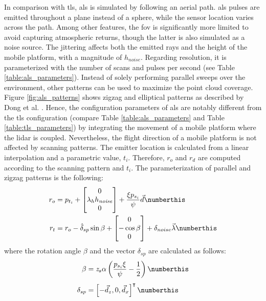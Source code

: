 In comparison with \acrshort{tls}, \acrshort{als} is simulated by following an aerial path. \acrshort{als} pulses are emitted throughout a plane instead of a sphere, while the sensor location varies across the path. Among other features, the \acrshort{fov} is significantly more limited to avoid capturing atmospheric returns, though the latter is also simulated as a noise source. The jittering affects both the emitted rays and the height of the mobile platform, with a magnitude of $h_\textit{noise}$. Regarding resolution, it is parameterized with the number of scans and pulses per second (see Table \ref{table:als_parameters}). Instead of solely performing parallel sweeps over the environment, other patterns can be used to maximize the point cloud coverage. Figure \ref{fig:als_patterns} shows zigzag and elliptical patterns as described by Dong et al. \cite{dong_lidar_2018}. Hence, the configuration parameters of \acrshort{als} are notably different from the \acrshort{tls} configuration (compare Table \ref{table:als_parameters} and Table \ref{table:tls_parameters}) by integrating the movement of a mobile platform where the \acrshort{lidar} is coupled. Nevertheless, the flight direction of a mobile platform is not affected by scanning patterns. The emitter location is calculated from a linear interpolation and a parametric value, $t_i$. Therefore, $r_o$ and $r_d$ are computed according to the scanning pattern and $t_i$. The parameterization of parallel and zigzag patterns is the following:
\begin{align*}
    r_{o} &= p_{t_{i}} + 
    \begin{bmatrix} 0 \\ \lambda_{h}h_{\textit{noise}} \\ 0 \end{bmatrix} + \frac{\xi p_{s_{i}}}{\psi} \vec{d}
    \numberthis \label{eq:ray_origin_als_zigzag}\\
    r_{t} &= r_{o} - \hat{\delta}_{sp} \sin{\beta} +
    \begin{bmatrix}0 \\ -\cos{\beta}\\ 0 \end{bmatrix} + \delta_{noise}\vec{\lambda}
    \numberthis \label{eq:ray_target_als_zigzag}
\end{align*}
where the rotation angle $\beta$ and the vector $\delta_{sp}$ are calculated as follows:
\begin{align*}
    \beta &= \textit{z}_{s}\alpha \left(\frac{p_{s_{i}} \xi}{\psi} - \frac{1}{2}\right)
    \numberthis \label{eq:beta_als_zigzag}\\[0.4em]
    \delta_{sp} &= \left[-\vec{d}_{z}, 0, \vec{d}_{x}\right]^\intercal
    \numberthis \label{eq:rotation_axis_als_zigzag}
\end{align*}

